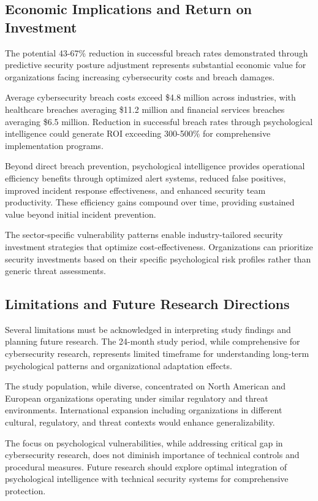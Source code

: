 \documentclass[10pt, twocolumn]{article}
\begin{document}
\subsection{Economic Implications and Return on Investment}

The potential 43-67\% reduction in successful breach rates demonstrated through predictive security posture adjustment represents substantial economic value for organizations facing increasing cybersecurity costs and breach damages.

Average cybersecurity breach costs exceed \$4.8 million across industries, with healthcare breaches averaging \$11.2 million and financial services breaches averaging \$6.5 million\cite{ibm2024}. Reduction in successful breach rates through psychological intelligence could generate ROI exceeding 300-500\% for comprehensive implementation programs.

Beyond direct breach prevention, psychological intelligence provides operational efficiency benefits through optimized alert systems, reduced false positives, improved incident response effectiveness, and enhanced security team productivity. These efficiency gains compound over time, providing sustained value beyond initial incident prevention.

The sector-specific vulnerability patterns enable industry-tailored security investment strategies that optimize cost-effectiveness. Organizations can prioritize security investments based on their specific psychological risk profiles rather than generic threat assessments.

\subsection{Limitations and Future Research Directions}

Several limitations must be acknowledged in interpreting study findings and planning future research. The 24-month study period, while comprehensive for cybersecurity research, represents limited timeframe for understanding long-term psychological patterns and organizational adaptation effects.

The study population, while diverse, concentrated on North American and European organizations operating under similar regulatory and threat environments. International expansion including organizations in different cultural, regulatory, and threat contexts would enhance generalizability.

The focus on psychological vulnerabilities, while addressing critical gap in cybersecurity research, does not diminish importance of technical controls and procedural measures. Future research should explore optimal integration of psychological intelligence with technical security systems for comprehensive protection.
\end{document}
